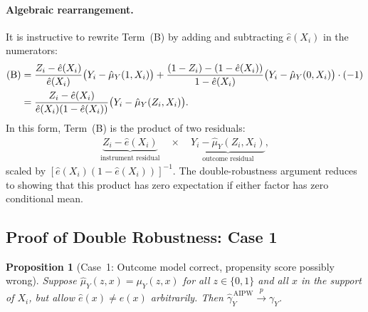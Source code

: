\documentclass[12pt,a4paper]{article}
\newtheorem{proposition}{Proposition}
\theoremstyle{remark}
\newcommand{\muY}{\mu_Y}
\newcommand{\muYhat}{\hat{\mu}_Y}
\newcommand{\ehat}{\hat{e}}
\begin{document}
\paragraph{Algebraic rearrangement.}
It is instructive to rewrite Term~(B) by adding and subtracting $\ehat(X_i)$
in the numerators:
\begin{align}
  \text{(B)}
  &=
  \frac{Z_i - \ehat(X_i)}{\ehat(X_i)}\bigl(Y_i - \muYhat(1,X_i)\bigr)
  +
  \frac{(1-Z_i) - (1-\ehat(X_i))}{1-\ehat(X_i)}\bigl(Y_i - \muYhat(0,X_i)\bigr)
  \cdot(-1)
  \notag \\
  &=
  \frac{Z_i - \ehat(X_i)}{\ehat(X_i)(1-\ehat(X_i))}
  \bigl(Y_i - \muYhat(Z_i, X_i)\bigr).
  \label{eq:B_rewrite}
\end{align}
In this form, Term~(B) is the product of two residuals:
\begin{align}
  \underbrace{Z_i - \ehat(X_i)}_{\text{instrument residual}}
  \quad \times \quad
  \underbrace{Y_i - \muYhat(Z_i,X_i)}_{\text{outcome residual}},
  \label{eq:product_residuals}
\end{align}
scaled by $[\ehat(X_i)(1-\ehat(X_i))]^{-1}$. The double-robustness argument reduces
to showing that this product has zero expectation if either factor has zero conditional
mean.

\subsection{Proof of Double Robustness: Case 1}
\label{subsec:dr_case1}

\begin{proposition}[Case~1: Outcome model correct, propensity score possibly wrong]
\label{prop:dr_case1}
Suppose $\muYhat(z,x) = \muY(z,x)$ for all $z \in \{0,1\}$ and all $x$ in the
support of $X_i$, but allow $\ehat(x) \neq e(x)$ arbitrarily. Then
$\hat{\gamma}_Y^{\,\mathrm{AIPW}} \xrightarrow{p} \gamma_Y$.
\end{proposition}
\end{document}
